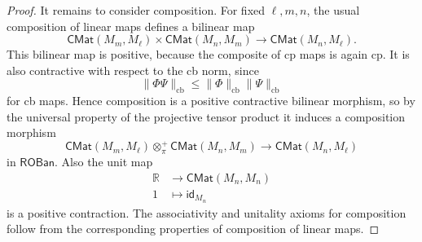 \documentclass[11pt,onecolumn]{article}
\newcommand{\R}{\mathbb{R}}
\newcommand{\id}{\mathsf{id}}
\newcommand{\ROBan}{\mathsf{ROBan}}
\theoremstyle{plain}
\theoremstyle{remark}
\theoremstyle{definition}
\begin{document}
\begin{proof}
	It remains to consider composition.
	For fixed $\ell,m,n$, the usual composition of linear maps defines a bilinear map
	\[
		\mathsf{CMat}(M_m,M_\ell) \times \mathsf{CMat}(M_n,M_m) \longrightarrow \mathsf{CMat}(M_n,M_\ell).
	\]
	This bilinear map is positive, because the composite of cp maps is again cp.
	It is also contractive with respect to the cb norm, since
	\[
		\|\Phi \Psi\|_{\mathrm{cb}} \le \|\Phi\|_{\mathrm{cb}} \|\Psi\|_{\mathrm{cb}}
	\]
	for cb maps.
	Hence composition is a positive contractive bilinear morphism, so by the universal property of the projective tensor product it induces a composition morphism
	\[
		\mathsf{CMat}(M_m,M_\ell) \otimes_\pi^+ \mathsf{CMat}(M_n,M_m) \longrightarrow \mathsf{CMat}(M_n,M_\ell)
	\]
	in $\ROBan$.
	Also the unit map 
	\begin{align*}
		\R & \longrightarrow \mathsf{CMat}(M_n,M_n) \\
		1 & \longmapsto \id_{M_n}
	\end{align*}
	is a positive contraction.
	The associativity and unitality axioms for composition follow from the corresponding properties of composition of linear maps.
\end{proof}
\end{document}
